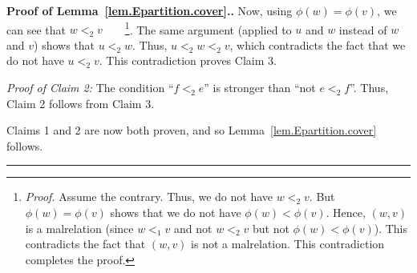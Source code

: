 \documentclass[numbers=enddot,12pt,final,onecolumn,notitlepage,abstracton]{scrartcl}
\theoremstyle{definition}
\newenvironment{proof}[1][Proof]{\noindent\textbf{#1.} }{\ \rule{0.5em}{0.5em}}
\begin{document}
\begin{proof}[Proof of Lemma~\ref{lem.Epartition.cover}.]
Now, using $\phi\left(w\right) = \phi\left(v\right)$, we can
see that $w <_2 v$\ \ \ \ \footnote{\textit{Proof.} Assume
the contrary. Thus, we do not have $w <_2 v$. But
$\phi\left(w\right) = \phi\left(v\right)$ shows that we do not
have $\phi\left(w\right) < \phi\left(v\right)$. Hence,
$\left(w, v\right)$ is a malrelation (since $w <_1 v$ and not
$w <_2 v$ but not $\phi\left(w\right) < \phi\left(v\right)$).
This contradicts the fact that $\left(w, v\right)$ is not
a malrelation. This contradiction completes the proof.}.
The same argument (applied to $u$ and $w$ instead of $w$ and
$v$) shows that $u <_2 w$. Thus, $u <_2 w <_2 v$, which
contradicts the fact that we do not have $u <_2 v$. This
contradiction proves Claim 3.

\textit{Proof of Claim 2:} The condition ``$f <_2 e$'' is stronger
than ``not $e <_2 f$''. Thus, Claim 2 follows from Claim 3.

Claims 1 and 2 are now both proven, and so
Lemma~\ref{lem.Epartition.cover} follows.
\end{proof}
\end{document}
